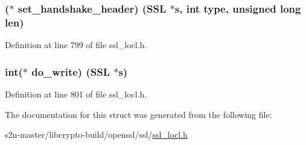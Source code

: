 \subsubsection[{\texorpdfstring{set\+\_\+handshake\+\_\+header}{set_handshake_header}}]{($\ast$ set\+\_\+handshake\+\_\+header) ({\bf S\+SL} $\ast$s, int {\bf type}, unsigned long {\bf len})}\hypertarget{structssl3__enc__method_ae4c379df536e6bf70625d353e244f752}{}\label{structssl3__enc__method_ae4c379df536e6bf70625d353e244f752}


Definition at line 799 of file ssl\+\_\+locl.\+h.

\subsubsection[{\texorpdfstring{do\+\_\+write}{do_write}}]{\setlength{\rightskip}{0pt plus 5cm}int($\ast$ do\+\_\+write) ({\bf S\+SL} $\ast$s)}\hypertarget{structssl3__enc__method_a7f2e7196bc342230282f597cc6299996}{}\label{structssl3__enc__method_a7f2e7196bc342230282f597cc6299996}


Definition at line 801 of file ssl\+\_\+locl.\+h.



The documentation for this struct was generated from the following file\+:\begin{DoxyCompactItemize}
\item 
s2n-\/master/libcrypto-\/build/openssl/ssl/\hyperlink{ssl__locl_8h}{ssl\+\_\+locl.\+h}\end{DoxyCompactItemize}
